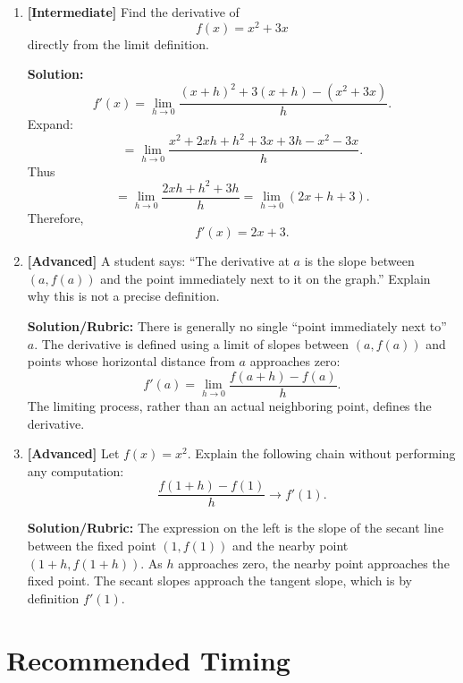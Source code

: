 \documentclass{article}
\begin{document}
\begin{enumerate}[leftmargin=*]
    \item \textbf{[Intermediate]} Find the derivative of
    \[
        f(x)=x^2+3x
    \]
    directly from the limit definition.

    \textbf{Solution:}
    \[
        f'(x)
        =
        \lim_{h\to0}
        \frac{(x+h)^2+3(x+h)-(x^2+3x)}{h}.
    \]
    Expand:
    \[
        =
        \lim_{h\to0}
        \frac{x^2+2xh+h^2+3x+3h-x^2-3x}{h}.
    \]
    Thus
    \[
        =
        \lim_{h\to0}
        \frac{2xh+h^2+3h}{h}
        =
        \lim_{h\to0}(2x+h+3).
    \]
    Therefore,
    \[
        \boxed{f'(x)=2x+3}.
    \]

    \item \textbf{[Advanced]} A student says: ``The derivative at $a$ is the slope between $(a,f(a))$ and the point immediately next to it on the graph.'' Explain why this is not a precise definition.

    \textbf{Solution/Rubric:}
    There is generally no single ``point immediately next to'' $a$. The derivative is defined using a limit of slopes between $(a,f(a))$ and points whose horizontal distance from $a$ approaches zero:
    \[
        f'(a)
        =
        \lim_{h\to0}
        \frac{f(a+h)-f(a)}{h}.
    \]
    The limiting process, rather than an actual neighboring point, defines the derivative.

    \item \textbf{[Advanced]} Let $f(x)=x^2$. Explain the following chain without performing any computation:
    \[
        \frac{f(1+h)-f(1)}{h}
        \longrightarrow
        f'(1).
    \]

    \textbf{Solution/Rubric:}
    The expression on the left is the slope of the secant line between the fixed point $(1,f(1))$ and the nearby point $(1+h,f(1+h))$. As $h$ approaches zero, the nearby point approaches the fixed point. The secant slopes approach the tangent slope, which is by definition $f'(1)$.

\end{enumerate}

\section*{Recommended Timing}
\end{document}
